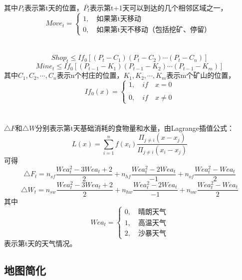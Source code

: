 \documentclass[withoutpre]{cumcmthesis} %
\begin{document}
其中$P_t$表示第t天的位置，$\bar{P_t}$表示第t+1天可以到达的几个相邻区域之一，
$$Move_t=\begin{cases}
1,\quad \text{如果第t天移动}\\
0,\quad \text{如果第t天不移动（包括挖矿、停留）}
\end{cases}$$\\\\
\begin{equation}
Shop_t\leqslant If_0[(P_t-C_1)(P_t-C_2)\cdots(P_t-C_n)]
\end{equation}
\begin{equation}
Mine_t\leqslant If_0[(P_{t-1}-K_1)(P_{t-1}-K_2)\cdots(P_{t-1}-K_m)]
\end{equation}其中$C_1,C_2,\cdots,C_n$表示n个村庄的位置，$K_1,K_2,\cdots,K_m$表示m个矿山的位置，
$$If_0(x)=\begin{cases}
1,\quad if\quad x=0\\\\
0,\quad if\quad x\neq0
\end{cases}$$\\\\

$\triangle F$和$\triangle W$分别表示第t天基础消耗的食物量和水量，由Lagrange插值公式：
$$L(x)=\sum_{i=1}^nf(x_i)\displaystyle\frac{\Pi_{j\neq i}(x-x_j)}{\Pi_{j\neq i}(x_i-x_j)}$$
可得
\begin{equation}
\triangle F_t=n_{sf}\frac{Wea_t^2-3Wea_t+2}{2}+n_{hf}\frac{Wea_t^2-2Wea_t}{-1}+n_{of}\frac{Wea_t^2-Wea_t}{2}
\end{equation}
\begin{equation}
\triangle W_t=n_{sw}\frac{Wea_t^2-3Wea_t+2}{2}+n_{hw}\frac{Wea_t^2-2Wea_t}{-1}+n_{ow}\frac{Wea_t^2-Wea_t}{2}
\end{equation}
其中$$Wea_t=\begin{cases}
0,\quad\text{晴朗天气}\\
1,\quad\text{高温天气}\\
2,\quad\text{沙暴天气}
\end{cases}$$表示第t天的天气情况。



\subsection{地图简化}
\end{document}
